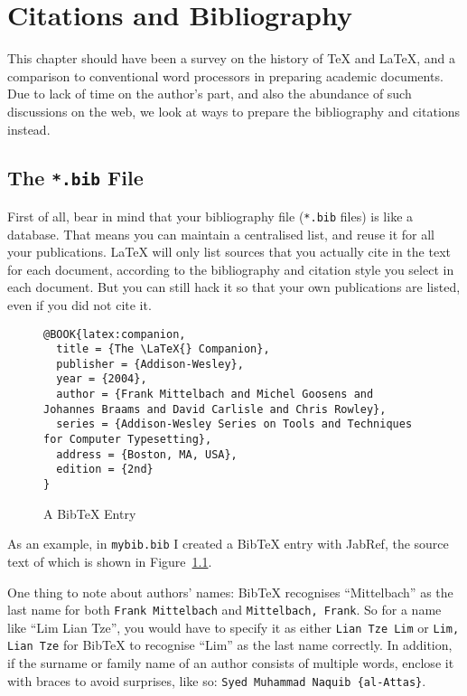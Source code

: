 \chapter{Citations and Bibliography}\label{chap:review}

This chapter should have been a survey on the history of \TeX{} and \LaTeX{}, and a comparison to conventional word processors in preparing academic documents.  Due to lack of time on the author's part, and also the abundance of such discussions on the web, we look at ways to prepare the bibliography and citations instead.

\section{The \texttt{*.bib} File}
First of all, bear in mind that your bibliography file (\verb|*.bib| files) is like a database.  That means you can maintain a centralised list, and reuse it for all your publications.  \LaTeX{} will only list sources that you actually cite in the text for each document, according to the bibliography and citation style you select in each document.  But you can still hack it so that your own publications are listed, even if you did not cite it.
 

\begin{figure}[htb!]
\begin{lstlisting}[language={}]
@BOOK{latex:companion,
  title = {The \LaTeX{} Companion},
  publisher = {Addison-Wesley},
  year = {2004},
  author = {Frank Mittelbach and Michel Goosens and Johannes Braams and David Carlisle and Chris Rowley},
  series = {Addison-Wesley Series on Tools and Techniques for Computer Typesetting},
  address = {Boston, MA, USA},
  edition = {2nd}
}
\end{lstlisting}
\caption{A BibTeX Entry}\label{fig:bibtex}
\end{figure}

As an example, in \verb|mybib.bib| I created a Bib\TeX{} entry with JabRef, the source text of which is shown in Figure~\ref{fig:bibtex}.

One thing to note about authors' names: Bib\TeX{} recognises ``Mittelbach'' as the last name for both \texttt{Frank Mittelbach} and \texttt{Mittelbach, Frank}.  So for a name like ``Lim Lian Tze'', you would have to specify it as either \texttt{Lian Tze Lim} or \texttt{Lim, Lian Tze} for Bib\TeX{} to recognise ``Lim'' as the last name correctly.  In addition, if the surname or family name of an author consists of multiple words, enclose it with braces to avoid surprises, like so: \texttt{Syed Muhammad Naquib \{al-Attas\}}.


